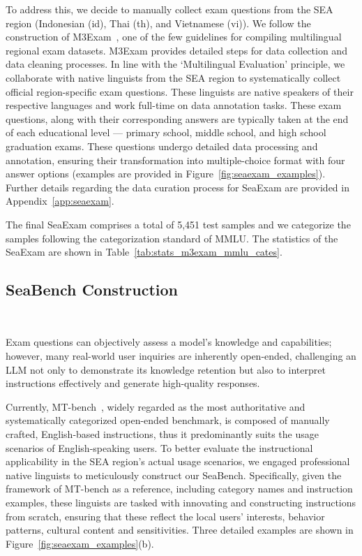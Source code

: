 To address this, we decide to manually collect exam questions from the SEA region (Indonesian (id), Thai (th), and Vietnamese (vi)). We follow the construction of M3Exam~\cite{zhang_m3exam_2023}, one of the few guidelines for compiling multilingual regional exam datasets. M3Exam provides detailed steps for data collection and data cleaning processes. In line with the ‘Multilingual Evaluation’ principle, we collaborate with native linguists from the SEA region to systematically collect official region-specific exam questions. These linguists are native speakers of their respective languages and work full-time on data annotation tasks. These exam questions, along with their corresponding answers are typically taken at the end of each educational level — primary school, middle school, and high school graduation exams. These questions undergo detailed data processing and annotation, ensuring their transformation into multiple-choice format with four answer options (examples are provided in Figure~\ref{fig:seaexam_examples}). Further details regarding the data curation process for SeaExam are provided in Appendix~\ref{app:seaexam}.

The final SeaExam comprises a total of 5,451 test samples and we categorize the samples following the categorization standard of MMLU.  The statistics of the SeaExam are shown in Table~\ref{tab:stats_m3exam_mmlu_cates}. 





\subsection{SeaBench Construction}~\label{subsection SeaBench}


Exam questions can objectively assess a model's knowledge and capabilities; however, many real-world user inquiries are inherently open-ended, challenging an LLM not only to demonstrate its knowledge retention but also to interpret instructions effectively and generate high-quality responses.

Currently, MT-bench~\cite{zheng_judging_2023}, widely regarded as the most authoritative and systematically categorized open-ended benchmark, is composed of manually crafted, English-based instructions, thus it predominantly suits the usage scenarios of English-speaking users. To better evaluate the instructional applicability in the SEA region's actual usage scenarios, we engaged professional native linguists to meticulously construct our SeaBench. Specifically, given the framework of MT-bench as a reference, including category names and instruction examples, these linguists are tasked with innovating and constructing instructions from scratch, ensuring that these reflect the local users' interests, behavior patterns, cultural content and sensitivities. Three detailed examples are shown in Figure~\ref{fig:seaexam_examples}(b).

